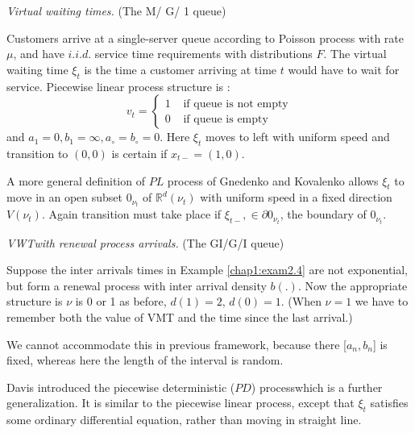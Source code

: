 \begin{example}\label{chap1:exam2.4} %
  \textit{Virtual waiting times.} (The M/ G/ 1 queue)

  Customers arrive at a single-server queue according to Poisson
  process with rate $\mu$, and have $i.i.d$. service time requirements
  with distributions $F$. The virtual waiting time $\xi_t$ is the time
  a customer arriving at time $t$ would have to wait for
  service. Piecewise linear process structure is :  
  $$
  v_t = 
  \begin{cases}
    1 &  \text{ if queue is not empty} \\
    0 &  \text{ if queue is empty} 
  \end{cases}
  $$
  and $a_1 = 0, b_1 = \infty, a_\circ = b_\circ=0$. Here $\xi_t$ moves
  to left with uniform speed and transition to $(0, 0)$ is certain if
  $x_{t-} = (1,0)$.  
\end{example}

A more general definition of $PL$ process of Gnedenko and Kova\-lenko
allows $\xi_t$ to move in an open subset $0_{\nu_t}$ of
$\mathbb{R}^{d}(\nu_t)$ with uniform speed in a fixed direction
$V(\nu_t)$. Again transition must take place if $\xi_{t-}, \in \partial
0_{\nu_t}$, the boundary of $0_{\nu_t}$.  

\begin{example} %
  \textit{VWT\pageoriginale with renewal process arrivals.} (The
  GI/G/I queue)  

  Suppose the inter arrivals times in Example \ref{chap1:exam2.4} are not
  exponential, but form a renewal process with inter arrival density
  $b(.)$. Now the appropriate structure is $\nu$ is 0 or 1 as
  before, $d(1) =2$, $d(0) = 1$. (When $\nu = 1$ we have to remember both
  the value of VMT and the time since the last arrival.) 
\end{example}		

We cannot accommodate this in previous framework, because there [$
  a_n, b_n$] is fixed, whereas here the length of the interval is
random.  
			
Davis \cite{key7} introduced the piecewise deterministic ($PD$) process\break which
is a further generalization. It is similar to the piecewise linear
process, except that $\xi_t$ satisfies some ordinary differential
equation, rather than moving in straight line.  

